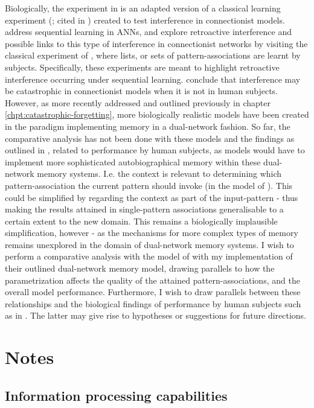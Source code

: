 Biologically, the experiment in \citep{Hattori2014, Hattori2010} is an adapted version of a classical learning experiment (\cite{Barnes1959}; cited in \cite{McCloskey1989}) created to test interference in connectionist models. \cite{McCloskey1989} address sequential learning in ANNs, and explore retroactive interference and possible links to this type of interference in connectionist networks by visiting the classical experiment of \citep{Barnes1959}, where lists, or sets of pattern-associations are learnt by subjects. Specifically, these experiments are meant to highlight retroactive interference occurring under sequential learning. \cite{McCloskey1989} conclude that interference may be catastrophic in connectionist models when it is not in human subjects. However, as more recently addressed and outlined previously in chapter \ref{chpt:catastrophic-forgetting}, more biologically realistic models have been created in the paradigm implementing memory in a dual-network fashion. So far, the comparative analysis has not been done with these models and the findings as outlined in \citep{McCloskey1989}, related to performance by human subjects, as models would have to implement more sophisticated autobiographical memory within these dual-network memory systems. I.e. the context is relevant to determining which pattern-association the current pattern should invoke (in the model of \cite{Hattori2014}). This could be simplified by regarding the context as part of the input-pattern - thus making the results attained in single-pattern associations generalisable to a certain extent to the new domain. This remains a biologically implausible simplification, however - as the mechanisms for more complex types of memory remains unexplored in the domain of dual-network memory systems. I wish to perform a comparative analysis with the model of \cite{Hattori2014} with my implementation of their outlined dual-network memory model, drawing parallels to how the parametrization affects the quality of the attained pattern-associations, and the overall model performance. Furthermore, I wish to draw parallels between these relationships and the biological findings of performance by human subjects such as in \citep{McCloskey1989, Barnes1959}. The latter may give rise to hypotheses or suggestions for future directions.


\section*{Notes}

\subsection*{Information processing capabilities}

